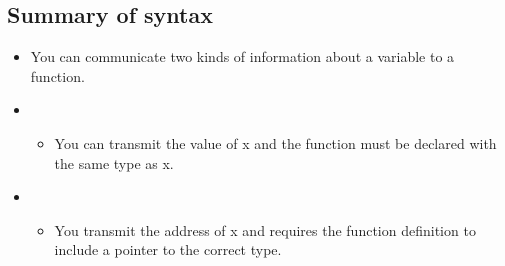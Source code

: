 \subsection{Summary of syntax}
\begin{itemize}
    \item You can communicate two kinds of information about a variable to a function. 
    \item {}
        \begin{itemize}
            \item You can transmit the value of x and the function must be declared with the same type as x. 
        \end{itemize}

    \item {}
        \begin{itemize}
            \item You transmit the address of x and requires the function definition to include a pointer to the correct type.
        \end{itemize}
\end{itemize}

